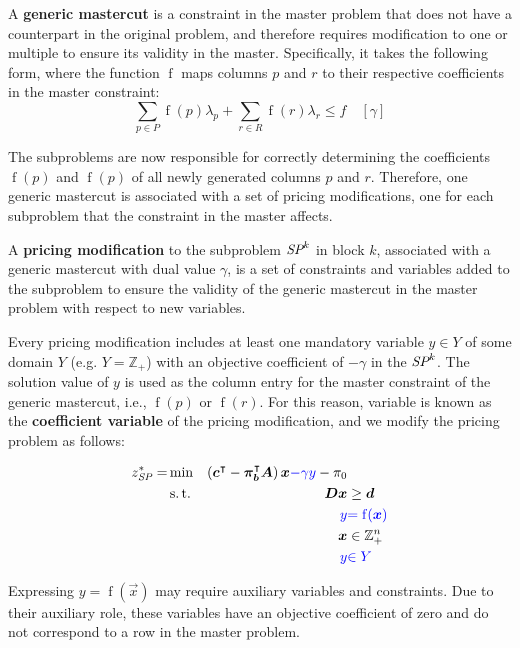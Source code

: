 \begin{definition}
A \textbf{generic mastercut} is a constraint in the master problem that does not have a counterpart in the original problem, and therefore requires modification to one or multiple \SP{} to ensure its validity in the master. Specifically, it takes the following form, where the function $\operatorname{f}$ maps columns $p$ and $r$ to their respective coefficients in the master constraint:
\begin{equation*}
\sum_{p \in P} \operatorname{f}(p) \lambda_p + \sum_{r \in R} \operatorname{f}(r) \lambda_r \leq f \quad \left[\gamma\right]
\end{equation*}

The subproblems are now responsible for correctly determining the coefficients $\operatorname{f}(p)$ and $\operatorname{f}(p)$ of all newly generated columns $p$ and $r$. Therefore, one generic mastercut is associated with a set of pricing modifications, one for each subproblem that the constraint in the master affects.
\end{definition}

\begin{definition}\label{def:gm_pricing_modification}
A \textbf{pricing modification} to the subproblem $\SP{k}$ in block $k$, associated with a generic mastercut with dual value $\gamma$, is a set of constraints and variables added to the subproblem to ensure the validity of the generic mastercut in the master problem with respect to new variables.

Every pricing modification includes at least one mandatory variable $y \in Y$ of some domain $Y$ (e.g. $Y = \mathbb{Z}_+$) with an objective coefficient of $-\gamma$ in the $\SP{k}$. The solution value of $y$ is used as the column entry for the master constraint of the generic mastercut, i.e., $\operatorname{f}(p)$ or $\operatorname{f}(r)$. For this reason, variable is known as the \textbf{coefficient variable} of the pricing modification, and we modify the pricing problem as follows:

\begin{equation*}
\begin{aligned}
z^*_\SP{} = &\min & \left( \vec{c}\transpose - \vec{\pi}_\vec{b}\transpose \mat{A} \right) \vec{x} {\color{blue} - \gamma y} - \pi_0 & \\
&\st & \mat{D} \vec{x} & \geq \vec{d} \\
&& {\color{blue} y} & {\color{blue} = \operatorname{f}(\vec{x})} \\
&& \vec{x} & \in \mathbb{Z}_+^n \\
&& {\color{blue} y} & {\color{blue} \in Y}
\end{aligned}
\end{equation*}

Expressing $y = \operatorname{f}(\vec{x})$ may require auxiliary variables and constraints. Due to their auxiliary role, these variables have an objective coefficient of zero and do not correspond to a row in the master problem.
\end{definition}

